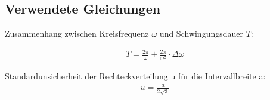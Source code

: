 

\subsection{Verwendete Gleichungen}\label{VGuD}


Zusammenhang zwischen Kreisfrequenz $\omega$ und Schwingungsdauer $T$:

\begin{align}
	T=\frac{2 \pi}{\omega} \pm \frac{2 \pi}{\omega^2} \cdot\Delta \omega  \label{eq:T}
\end{align} 



Standardunsicherheit der Rechteckverteilung u für die Intervallbreite a:
\begin{align}
	u=\frac{a}{2\sqrt{3}}\label{eq:SR}
\end{align} 


